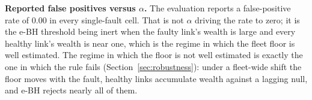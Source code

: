 \textbf{Reported false positives versus $\alpha$.} The evaluation reports a false-positive rate of 0.00 in every single-fault cell. That is not $\alpha$ driving the rate to zero; it is the e-BH threshold being inert when the faulty link's wealth is large and every healthy link's wealth is near one, which is the regime in which the fleet floor is well estimated. The regime in which the floor is not well estimated is exactly the one in which the rule fails (Section~\ref{sec:robustness}): under a fleet-wide shift the floor moves with the fault, healthy links accumulate wealth against a lagging null, and e-BH rejects nearly all of them.
